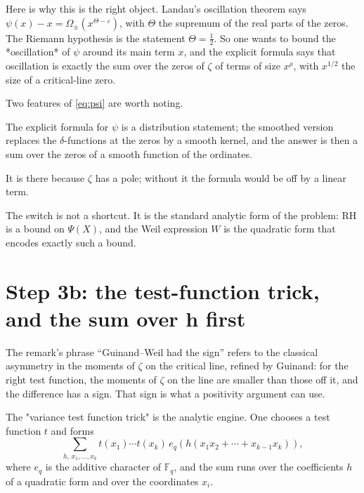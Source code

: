 Here is why this is the right object. Landau's oscillation theorem says
$\psi(x) - x = \Omega_\pm(x^{\Theta - \varepsilon})$, with $\Theta$ the
supremum of the real parts of the zeros. The Riemann hypothesis is the
statement $\Theta = \tfrac12$. So one wants to bound the *oscillation* of
$\psi$ around its main term $x$, and the explicit formula says that oscillation
is exactly the sum over the zeros of $\zeta$ of terms of size $x^{\rho}$, with
$x^{1/2}$ the size of a critical-line zero.

Two features of \eqref{eq:psi} are worth noting.

\begin{description}[style=nextline,leftmargin=0pt,labelwidth=0pt,labelsep=0pt,font=\sffamily\bfseries\small,
  itemsep=6pt]
\item[The truncation $(X/n-1)_+$ is the smoothing.] The explicit formula for
$\psi$ is a distribution statement; the smoothed version replaces the
$\delta$-functions at the zeros by a smooth kernel, and the answer is then a
sum over the zeros of a smooth function of the ordinates.
\item[The $(1+\gamma)X$ term is the residue at $s=1$.] It is there because
$\zeta$ has a pole; without it the formula would be off by a linear term.
\end{description}

The switch is not a shortcut. It is the standard analytic form of the problem:
RH is a bound on $\Psi(X)$, and the Weil expression $W$ is the quadratic form
that encodes exactly such a bound.

\section{Step 3b: the test-function trick, and the sum over h first}The remark's phrase ``Guinand--Weil had the sign'' refers to the classical
asymmetry in the moments of $\zeta$ on the critical line, refined by Guinand:
for the right test function, the moments of $\zeta$ on the line are smaller
than those off it, and the difference has a sign. That sign is what a
positivity argument can use.

The "variance test function trick" is the analytic engine. One chooses a test
function $t$ and forms
\begin{equation}
\sum_{h,\,x_1,\dots,x_k} t(x_1)\cdots t(x_k)\,e_q\!\left(h(x_1x_2 + \cdots + x_{k-1}x_k)\right),
\label{eq:trick}
\end{equation}
where $e_q$ is the additive character of $\mathbb{F}_q$, and the sum runs over
the coefficients $h$ of a quadratic form and over the coordinates $x_i$.

